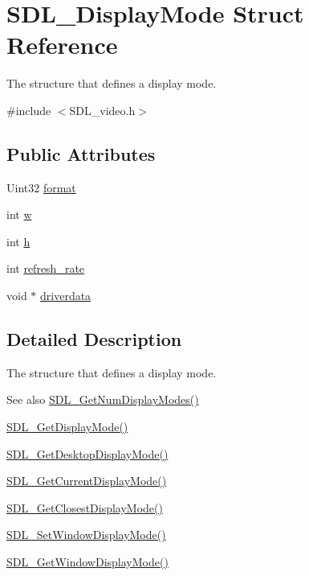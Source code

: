 \hypertarget{struct_s_d_l___display_mode}{}\section{S\+D\+L\+\_\+\+Display\+Mode Struct Reference}
\label{struct_s_d_l___display_mode}


The structure that defines a display mode.  




{\ttfamily \#include $<$S\+D\+L\+\_\+video.\+h$>$}

\subsection*{Public Attributes}
\begin{DoxyCompactItemize}
\item 
Uint32 \mbox{\hyperlink{struct_s_d_l___display_mode_ae8120e0a18a99992f039756e1b503680}{format}}
\item 
int \mbox{\hyperlink{struct_s_d_l___display_mode_a504bb5e21950b719a0df43be51199046}{w}}
\item 
int \mbox{\hyperlink{struct_s_d_l___display_mode_a0d9eabed50a560ed553af772c26632d7}{h}}
\item 
int \mbox{\hyperlink{struct_s_d_l___display_mode_ad1b5783c9b292ebf24ad4e0e7a98e540}{refresh\+\_\+rate}}
\item 
void $\ast$ \mbox{\hyperlink{struct_s_d_l___display_mode_a411f93025411da873f37a384ae62bbcf}{driverdata}}
\end{DoxyCompactItemize}


\subsection{Detailed Description}
The structure that defines a display mode. 

\begin{DoxySeeAlso}{See also}
\mbox{\hyperlink{_s_d_l__video_8h_a5abcf18592f00019c517e791f8ba53fc}{S\+D\+L\+\_\+\+Get\+Num\+Display\+Modes()}} 

\mbox{\hyperlink{_s_d_l__video_8h_a0a53e003ec6ad24dd2bbbcd0ad297311}{S\+D\+L\+\_\+\+Get\+Display\+Mode()}} 

\mbox{\hyperlink{_s_d_l__video_8h_ab97bca68fc068a6ecc3db473c4c0defd}{S\+D\+L\+\_\+\+Get\+Desktop\+Display\+Mode()}} 

\mbox{\hyperlink{_s_d_l__video_8h_a14dce1cb33085b36f08d27b3d8f2335b}{S\+D\+L\+\_\+\+Get\+Current\+Display\+Mode()}} 

\mbox{\hyperlink{_s_d_l__video_8h_a794be92ee0a9efca226fa19a635fa470}{S\+D\+L\+\_\+\+Get\+Closest\+Display\+Mode()}} 

\mbox{\hyperlink{_s_d_l__video_8h_a2ca17d1e857d1560738e002c9935088a}{S\+D\+L\+\_\+\+Set\+Window\+Display\+Mode()}} 

\mbox{\hyperlink{_s_d_l__video_8h_a8185547bc7cb0bbeb400f459792d081a}{S\+D\+L\+\_\+\+Get\+Window\+Display\+Mode()}} 
\end{DoxySeeAlso}


